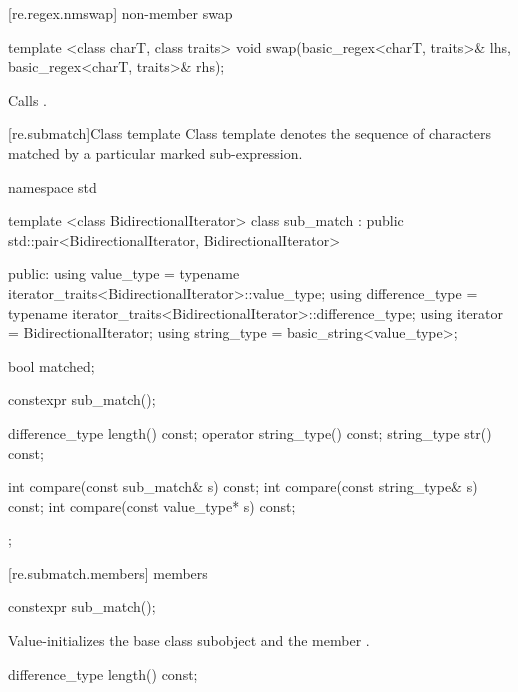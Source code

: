 [re.regex.nmswap]{ non-member swap}
%
%
\begin{itemdecl}
template <class charT, class traits>
  void swap(basic_regex<charT, traits>& lhs, basic_regex<charT, traits>& rhs); 
\end{itemdecl}

\begin{itemdescr}
\pnum\effects  Calls .
\end{itemdescr}

[re.submatch]{Class template }
\pnum
{}%
Class template  denotes the sequence of characters matched
by a particular marked sub-expression.

\begin{codeblock}
namespace std {
  template <class BidirectionalIterator>
  class sub_match : public std::pair<BidirectionalIterator, BidirectionalIterator> {
  public:
     using value_type      =
             typename iterator_traits<BidirectionalIterator>::value_type;
     using difference_type =
             typename iterator_traits<BidirectionalIterator>::difference_type;
     using iterator        = BidirectionalIterator;
     using string_type     = basic_string<value_type>;

     bool matched;

     constexpr sub_match();

     difference_type length() const;
     operator string_type() const;
     string_type str() const;

     int compare(const sub_match& s) const;
     int compare(const string_type& s) const;
     int compare(const value_type* s) const;
  }; 
}
\end{codeblock}


[re.submatch.members]{ members}

%
\begin{itemdecl}
constexpr sub_match();
\end{itemdecl}

\begin{itemdescr}
\pnum
\effects Value-initializes the  base class subobject and the member
.
\end{itemdescr}

%
%
\begin{itemdecl}
difference_type length() const;
\end{itemdecl}

